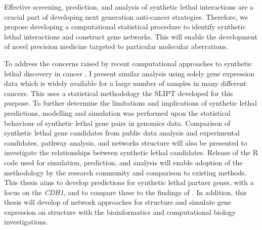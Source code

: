 

Effective screening, prediction, and analysis of \gls{synthetic lethal} interactions are a crucial part of developing next generation anti-cancer strategies. Therefore, we propose developing a computational statistical procedure to identify \gls{synthetic lethal} interactions and construct gene networks. This will enable the development of novel \gls{precision medicine} targeted to particular molecular aberrations. %

To address the concerns raised by recent computational approaches to \gls{synthetic lethal} discovery in cancer \citep{Jerby2014, Lu2015, Wappett2016}, I present similar analysis using solely \gls{gene expression} data which is widely available for a large number of samples in many different cancers. This uses a statistical methodology the \gls{SLIPT} developed for this purpose. To further determine the limitations and implications of \gls{synthetic lethal} predictions, modelling and simulation was performed upon the statistical behaviour of \gls{synthetic lethal} gene pairs in \glspl{genomic} data. Comparison of \gls{synthetic lethal} gene candidates from public data analysis and experimental candidates, pathway analysis, and networks structure will also be presented to investigate the relationships between \gls{synthetic lethal} candidates. Release of the R code used for simulation, prediction, and analysis will enable adoption of the methodology by the research community and comparison to existing methods. This thesis aims to develop predictions for \gls{synthetic lethal} partner genes, with a focus on the \textit{CDH1}, and to compare these to the findings of \citet{Telford2015}. In addition, this thesis will develop of network approaches for  structure and simulate \gls{gene expression} on  structure with the \gls{bioinformatics} and \gls{computational biology} investigations.

